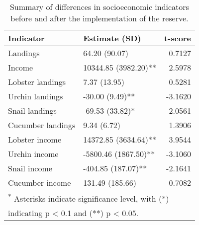 \documentclass[12pt,]{article}
\begin{document}
\begin{table}

\caption{\label{tab:table of soc results}Summary of differences in socioeconomic indicators before and after the implementation of the reserve.}
\centering
\begin{tabular}[t]{l|l|r}
\hline
Indicator & Estimate (SD) & t-score\\
\hline
Landings & 64.20 (90.07) & 0.7127\\
\hline
Income & 10344.85 (3982.20)** & 2.5978\\
\hline
Lobster landings & 7.37 (13.95) & 0.5281\\
\hline
Urchin landings & -30.00 (9.49)** & -3.1620\\
\hline
Snail landings & -69.53 (33.82)* & -2.0561\\
\hline
Cucumber landings & 9.34 (6.72) & 1.3906\\
\hline
Lobster income & 14372.85 (3634.64)** & 3.9544\\
\hline
Urchin income & -5800.46 (1867.50)** & -3.1060\\
\hline
Snail income & -404.85 (187.07)** & -2.1641\\
\hline
Cucumber income & 131.49 (185.66) & 0.7082\\
\hline
\multicolumn{3}{l}{\textsuperscript{*} Asterisks indicate significance level, with (*)}\\
\multicolumn{3}{l}{indicating p < 0.1 and (**) p < 0.05.}\\
\end{tabular}
\end{table}
\end{document}
